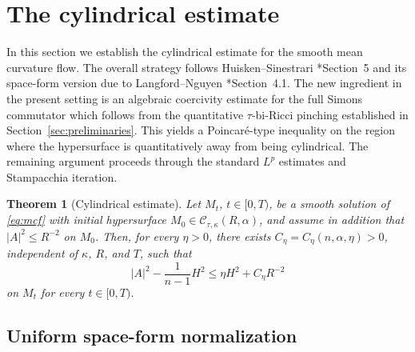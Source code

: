 \documentclass[11pt,reqno]{amsart}
\newtheorem{theorem}[proposition]{Theorem}
\theoremstyle{definition}
\theoremstyle{remark}
\numberwithin{equation}{section}
\newcommand{\CC}{\mathcal C}
\begin{document}
\section{The cylindrical estimate}\label{sec:cylindrical}

In this section we establish the cylindrical estimate for the smooth mean
curvature flow.  The overall strategy follows 
Huisken--Sinestrari \cite{HS09}*{Section~5} and its space-form version due to
Langford--Nguyen \cite{LN21}*{Section~4.1}.  The new ingredient in the present
setting is an algebraic coercivity estimate for the full Simons commutator
which follows from the quantitative $\tau$-bi-Ricci pinching established in
Section~\ref{sec:preliminaries}.  This yields a Poincar\'e-type inequality on
the region where the hypersurface is quantitatively away from being
cylindrical.  The remaining argument proceeds through the standard
$L^p$ estimates and Stampacchia iteration.



\begin{theorem}[Cylindrical estimate]\label{thm:cylindrical}
Let $M_t$, $t\in[0,T)$, be a smooth solution of \eqref{eq:mcf} with
initial hypersurface
$M_0\in\CC_{\tau,\kappa}(R,\alpha)$, and assume in addition that
$|A|^2\leq R^{-2}$ on $M_0$.  Then, for every $\eta>0$, there exists
$C_\eta=C_\eta(n,\alpha,\eta)>0$, independent of $\kappa$, $R$, and $T$,
such that
\begin{equation}\label{eq:cylindrical}
 |A|^2-\frac{1}{n-1}H^2
 \leq \eta H^2+C_\eta R^{-2}
\end{equation}
on $M_t$ for every $t\in[0,T)$.
\end{theorem}

\subsection{Uniform space-form normalization}\label{subsec:space-form-normalization}
\end{document}
